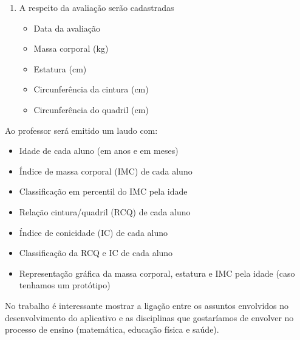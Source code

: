 \documentclass[a4paper,12pt]{report}
\begin{document}
\begin{enumerate}
\begin{itemize}
                \end{itemize}

            \item A respeito da avaliação serão cadastradas

                \begin{itemize}

                    \item Data da avaliação

                    \item Massa corporal (kg)

                    \item Estatura (cm)

                    \item Circunferência da cintura (cm)

                    \item Circunferência do quadril (cm)

                \end{itemize}

        \end{enumerate}
        
        Ao professor será emitido um laudo com:

        \begin{itemize}

            \item Idade de cada aluno (em anos e em meses)

            \item Índice de massa corporal (IMC) de cada aluno

            \item Classificação em percentil do IMC pela idade

            \item Relação cintura/quadril (RCQ) de cada aluno

            \item Índice de conicidade (IC) de cada aluno

            \item Classificação da RCQ e IC de cada aluno

            \item Representação gráfica da massa corporal, estatura e IMC
            pela idade (caso tenhamos um protótipo)

        \end{itemize}

        No trabalho é interessante mostrar a ligação entre os assuntos
        envolvidos no desenvolvimento do aplicativo e as disciplinas que
        gostaríamos de envolver no processo de ensino (matemática, educação
        física e saúde).
\end{document}
